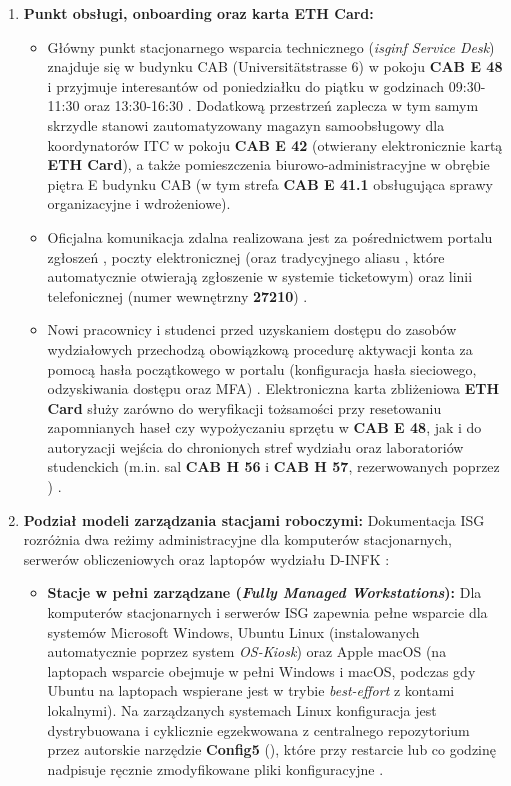 {{\begin{enumerate}
    \item \textbf{Punkt obsługi, onboarding oraz karta ETH Card:}
    \begin{itemize}
        \item Główny punkt stacjonarnego wsparcia technicznego (\textit{isginf Service Desk}) znajduje się w budynku CAB (Universitätstrasse 6) w pokoju \textbf{CAB E 48} i przyjmuje interesantów od poniedziałku do piątku w godzinach 09:30-11:30 oraz 13:30-16:30 \cite{isg_dinfk_wiki}. Dodatkową przestrzeń zaplecza w tym samym skrzydle stanowi zautomatyzowany magazyn samoobsługowy dla koordynatorów ITC w pokoju \textbf{CAB E 42} (otwierany elektronicznie kartą \textbf{ETH Card}), a także pomieszczenia biurowo-administracyjne w obrębie piętra E budynku CAB (w tym strefa \textbf{CAB E 41.1} obsługująca sprawy organizacyjne i wdrożeniowe).
        \item Oficjalna komunikacja zdalna realizowana jest za pośrednictwem portalu zgłoszeń , poczty elektronicznej  (oraz tradycyjnego aliasu , które automatycznie otwierają zgłoszenie w systemie ticketowym) oraz linii telefonicznej  (numer wewnętrzny \textbf{27210}) \cite{isg_dinfk_wiki}.
        \item Nowi pracownicy i studenci przed uzyskaniem dostępu do zasobów wydziałowych przechodzą obowiązkową procedurę aktywacji konta  za pomocą hasła początkowego w portalu  (konfiguracja hasła sieciowego, odzyskiwania dostępu oraz MFA) \cite{eth_password_iam}. Elektroniczna karta zbliżeniowa \textbf{ETH Card} służy zarówno do weryfikacji tożsamości przy resetowaniu zapomnianych haseł czy wypożyczaniu sprzętu w \textbf{CAB E 48}, jak i do autoryzacji wejścia do chronionych stref wydziału oraz laboratoriów studenckich (m.in. sal \textbf{CAB H 56} i \textbf{CAB H 57}, rezerwowanych poprzez ) \cite{isg_dinfk_wiki}.
    \end{itemize}
    \item \textbf{Podział modeli zarządzania stacjami roboczymi:}
    Dokumentacja ISG rozróżnia dwa reżimy administracyjne dla komputerów stacjonarnych, serwerów obliczeniowych oraz laptopów wydziału D-INFK \cite{isg_dinfk_wiki}:
    \begin{itemize}
        \item \textbf{Stacje w pełni zarządzane (\textit{Fully Managed Workstations}):} Dla komputerów stacjonarnych i serwerów ISG zapewnia pełne wsparcie dla systemów Microsoft Windows, Ubuntu Linux (instalowanych automatycznie poprzez system \textit{OS-Kiosk}) oraz Apple macOS (na laptopach wsparcie obejmuje w pełni Windows i macOS, podczas gdy Ubuntu na laptopach wspierane jest w trybie \textit{best-effort} z kontami lokalnymi). Na zarządzanych systemach Linux konfiguracja jest dystrybuowana i cyklicznie egzekwowana z centralnego repozytorium przez autorskie narzędzie \textbf{Config5} (), które przy restarcie lub co godzinę nadpisuje ręcznie zmodyfikowane pliki konfiguracyjne \cite{isg_dinfk_wiki}.

\end{itemize}
\end{enumerate}}}
